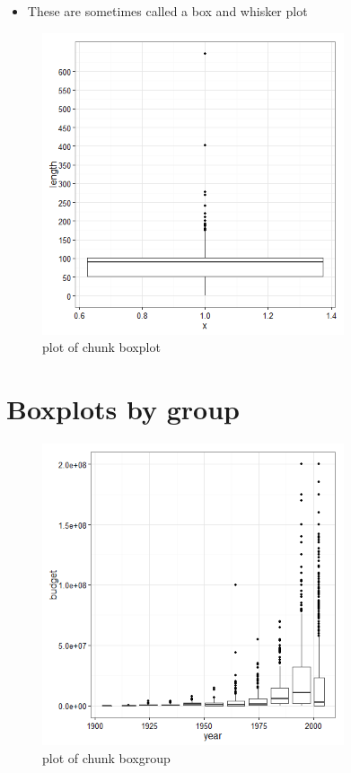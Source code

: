 \documentclass[12pt]{article}
\begin{document}
\begin{itemize}
\itemsep1pt\parskip0pt
\item
  These are sometimes called a box and whisker plot
\end{itemize}

\begin{figure}[H]
\centering
\includegraphics[width=3.5in]{figure/boxplot-1.png}
\caption{plot of chunk boxplot}
\end{figure}

\section{Boxplots by group}\label{boxplots-by-group}

\begin{figure}[H]
\centering
\includegraphics[width=3.5in]{figure/boxgroup-1.png}
\caption{plot of chunk boxgroup}
\end{figure}
\end{document}
